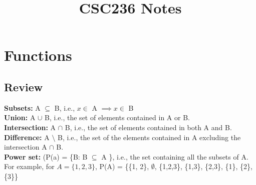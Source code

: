 \documentclass{article}
\title{CSC236 Notes}
\author{}
\date{}
\begin{document}
\maketitle

\tableofcontents

\newpage

\section{Functions}
\subsection{Review}
\textbf{Subsets: }A $\subseteq$ B, i.e., $x \in $ A $\implies x \in $ B\\
\textbf{Union: }A $\cup$ B, i.e., the set of elements contained in A or B.\\
\textbf{Intersection: }A $\cap$ B, i.e., the set of elements contained in both A and B.\\
\textbf{Difference: }A $\setminus$ B, i.e., the set of the elements contained in A excluding the intersection A $\cap$ B.\\
\textbf{Power set: } (P(a) = \{B: B $\subseteq$ A \}, i.e., the set containing all the subsets of A.
For example, for $A = \{1, 2, 3\}$, P(A) = \{\{1, 2\}, $\emptyset$, \{1,2,3\}, \{1,3\}, \{2,3\}, \{1\}, \{2\}, \{3\}\}
\end{document}
